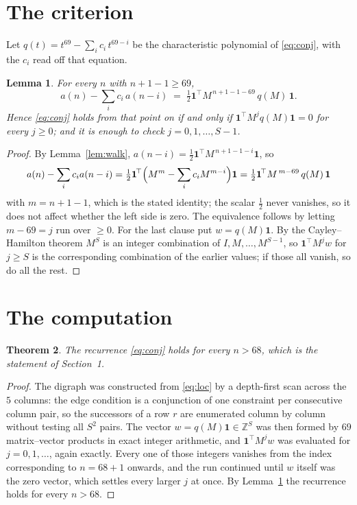 \documentclass[11pt,a4paper]{article}
\theoremstyle{plain}
\newtheorem{theorem}{Theorem}
\newtheorem{lemma}[theorem]{Lemma}
\theoremstyle{definition}
\begin{document}
\section{The criterion}

Let $q(t)=t^{69}-\sum_i c_i\,t^{69-i}$ be the characteristic polynomial of
\eqref{eq:conj}, with the $c_i$ read off that equation.

\begin{lemma}\label{lem:crit}
For every $n$ with $n+1-1\ge69$,
\[
a(n)-\sum_i c_i\,a(n-i)\;=\;\tfrac1{2}\mathbf{1}^{\!\top}M^{\,n+1-1-69}\,q(M)\,\mathbf{1} .
\]
Hence \eqref{eq:conj} holds from that point on if and only if
$\mathbf{1}^{\!\top}M^{j}q(M)\mathbf{1}=0$ for every $j\ge0$; and it is enough to check
$j=0,1,\dots,S-1$.
\end{lemma}

\begin{proof}
By Lemma~\ref{lem:walk}, $a(n-i)=\tfrac1{2}\mathbf{1}^{\!\top}M^{\,n+1-1-i}\mathbf{1}$, so
\[
a(n)-\sum_i c_i a(n-i)
=\tfrac1{2}\mathbf{1}^{\!\top}\Bigl(M^{m}-\sum_i c_i M^{m-i}\Bigr)\mathbf{1}
=\tfrac1{2}\mathbf{1}^{\!\top}M^{\,m-69}\,q(M)\,\mathbf{1}
\]
with $m=n+1-1$, which is the stated identity; the scalar $\tfrac1{2}$ never vanishes, so
it does not affect whether the left side is zero. The equivalence follows by letting
$m-69=j$ run over $\ge0$. For the last clause put $w=q(M)\mathbf{1}$. By the
Cayley--Hamilton theorem $M^{S}$ is an integer combination of $I,M,\dots,M^{S-1}$, so
$\mathbf{1}^{\!\top}M^{j}w$ for $j\ge S$ is the corresponding combination of the earlier
values; if those all vanish, so do all the rest.
\end{proof}

\section{The computation}

\begin{theorem}
The recurrence \eqref{eq:conj} holds for every $n>68$, which is the statement of
Section~1.
\end{theorem}

\begin{proof}
The digraph was constructed from \eqref{eq:loc} by a depth-first scan across the $5$
columns: the edge condition is a conjunction of one constraint per consecutive column
pair, so the successors of a row $r$ are enumerated column by column without testing all
$S^2$ pairs. The vector $w=q(M)\mathbf{1}\in\mathbb{Z}^{S}$ was then formed by $69$
matrix--vector products in exact integer arithmetic, and $\mathbf{1}^{\!\top}M^{j}w$ was
evaluated for $j=0,1,\dots$, again exactly. Every one of those integers vanishes from the
index corresponding to $n=68+1$ onwards, and the run continued until $w$ itself was the
zero vector, which settles every larger $j$ at once. By Lemma~\ref{lem:crit} the recurrence
holds for every $n>68$.
\end{proof}
\end{document}
